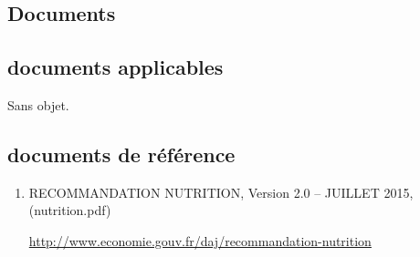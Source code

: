 \textcolor[RGB]{46, 116, 181}{\chapter{Documents}}
\section{documents applicables}
Sans objet.
\section{documents de référence}
\begin{enumerate}
\item\label{docNutrition} RECOMMANDATION NUTRITION, Version 2.0 – JUILLET 2015, (nutrition.pdf)

\url{http://www.economie.gouv.fr/daj/recommandation-nutrition}
\end{enumerate}
\setenumerate{}
